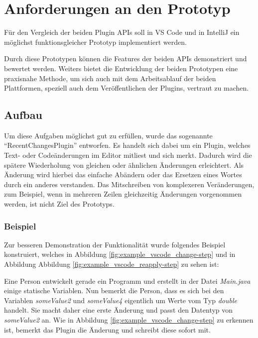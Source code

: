 \chapter{Anforderungen an den Prototyp}
\label{cha:Prototyp}

Für den Vergleich der beiden Plugin APIs soll 
in VS Code und in IntelliJ ein möglichst funktionsgleicher 
Prototyp implementiert werden.

Durch diese Prototypen können die Features der beiden APIs 
demonstriert und bewertet werden. Weiters bietet die Entwicklung
der beiden Prototypen
eine praxisnahe Methode, um sich auch mit dem Arbeitsablauf der
beiden Plattformen, speziell auch dem Veröffentlichen
der Plugins, vertraut zu machen.

\section{Aufbau}
\label{sec:Prototyp_Aufbau}

Um diese Aufgaben möglichst gut zu erfüllen, wurde das sogenannte
\enquote{RecentChangesPlugin} entworfen. Es handelt sich 
dabei um ein Plugin, welches Text- oder Codeänderungen 
im Editor mitliest und sich merkt. Dadurch wird die spätere
Wiederholung von gleichen oder ähnlichen Änderungen erleichtert.
Als Änderung wird hierbei das einfache Abändern oder das Ersetzen eines
Wortes durch ein anderes verstanden. 
Das Mitschreiben von komplexeren Veränderungen, zum Beispiel, 
wenn in mehreren Zeilen gleichzeitig Änderungen vorgenommen 
werden, ist nicht Ziel des Prototyps.

\subsection{Beispiel}

Zur besseren Demonstration der Funktionalität wurde folgendes 
Beispiel konstruiert, welches in Abbildung \ref{fig:example_vscode_change-step}
und in Abbildung Abbildung \ref{fig:example_vscode_reapply-step}
zu sehen ist:

Eine Person entwickelt gerade ein Programm und erstellt 
in der Datei \emph{Main.java} einige statische Variablen.
Nun bemerkt die Person, dass es sich bei den Variablen 
\emph{someValue2} und \emph{someValue4} eigentlich um 
Werte vom Typ \emph{double} handelt. Sie macht daher eine 
erste Änderung und passt den Datentyp von \emph{someValue2} an.
Wie in Abbildung \ref{fig:example_vscode_change-step} zu erkennen ist,
bemerkt das Plugin die Änderung und schreibt diese sofort mit.

